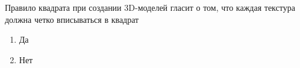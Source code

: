 
Правило квадрата при создании 3D-моделей гласит о том, что каждая текстура должна четко вписываться в квадрат

\begin{enumerate}
    \item Да
    \item Нет
\end{enumerate}

